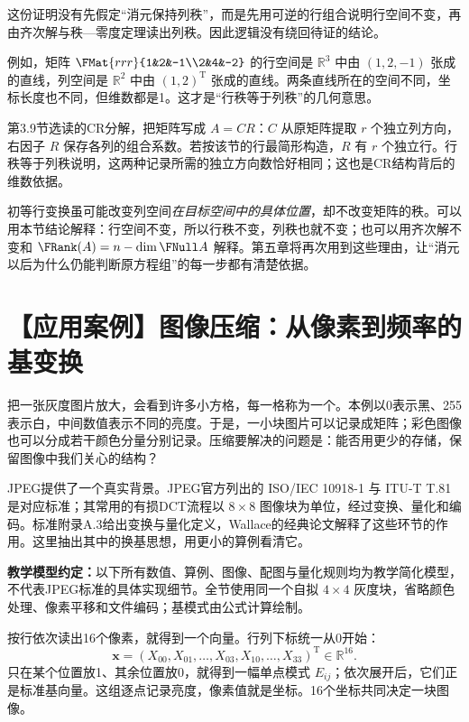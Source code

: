 \documentclass[a4paper,12pt,twoside,openany,fontset=none]{ctexbook}
\numberwithin{equation}{chapter}
\begin{document}
这份证明没有先假定“消元保持列秩”，而是先用可逆的行组合说明行空间不变，再由齐次解与秩—零度定理读出列秩。因此逻辑没有绕回待证的结论。

例如，矩阵 $\FMat{rrr}{1&2&-1\\2&4&-2}$ 的行空间是 $\mathbb R^3$ 中由 $(1,2,-1)$ 张成的直线，列空间是 $\mathbb R^2$ 中由 $(1,2)^{\mathrm T}$ 张成的直线。两条直线所在的空间不同，坐标长度也不同，但维数都是1。这才是“行秩等于列秩”的几何意思。

第3.9节选读的CR分解，把矩阵写成 $A=CR$：$C$ 从原矩阵提取 $r$ 个独立列方向，右因子 $R$ 保存各列的组合系数。若按该节的行最简形构造，$R$ 有 $r$ 个独立行。行秩等于列秩说明，这两种记录所需的独立方向数恰好相同；这也是CR结构背后的维数依据。

初等行变换虽可能改变列空间\emph{在目标空间中的具体位置}，却不改变矩阵的秩。可以用本节结论解释：行空间不变，所以行秩不变，列秩也就不变；也可以用齐次解不变和 $\FRank(A)=n-\dim\FNull A$ 解释。第五章将再次用到这些理由，让“消元以后为什么仍能判断原方程组”的每一步都有清楚依据。


\clearpage
\section{【应用案例】图像压缩：从像素到频率的基变换}
\label{sec:four-image-compression}
把一张灰度图片放大，会看到许多小方格，每一格称为一个。本例以0表示黑、255表示白，中间数值表示不同的亮度。于是，一小块图片可以记录成矩阵；彩色图像也可以分成若干颜色分量分别记录。压缩要解决的问题是：能否用更少的存储，保留图像中我们关心的结构？

JPEG提供了一个真实背景。JPEG官方列出的 ISO/IEC 10918-1 与 ITU-T T.81 是对应标准；其常用的有损DCT流程以 $8\times8$ 图像块为单位，经过变换、量化和编码。标准附录A.3给出变换与量化定义，Wallace的经典论文解释了这些环节的作用。\cite{jpeg-official-specs,jpeg-t81,wallace-jpeg1991}这里抽出其中的换基思想，用更小的算例看清它。

{\small\color{FourGray}\noindent\textbf{教学模型约定：}以下所有数值、算例、图像、配图与量化规则均为教学简化模型，不代表JPEG标准的具体实现细节。全节使用同一个自拟 $4\times4$ 灰度块，省略颜色处理、像素平移和文件编码；基模式由公式计算绘制。\par}

按行依次读出16个像素，就得到一个向量。行列下标统一从0开始：
\[
 \boldsymbol x=(X_{00},X_{01},\ldots,X_{03},X_{10},\ldots,X_{33})^{\mathrm T}
 \in\mathbb R^{16}.
\]
只在某个位置放1、其余位置放0，就得到一幅单点模式 $E_{ij}$；依次展开后，它们正是标准基向量。这组逐点记录亮度，像素值就是坐标。16个坐标共同决定一块图像。
\end{document}
